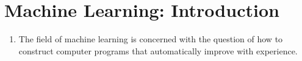 \chapter{Machine Learning: Introduction}

\begin{enumerate}[itemsep=0.2cm]
    \item The field of machine learning is concerned with the question of how to construct computer programs that automatically improve with experience.
    \hfill \cite{ml/book/Machine-Learning/Tom-M-Mitchell}

    

\end{enumerate}


